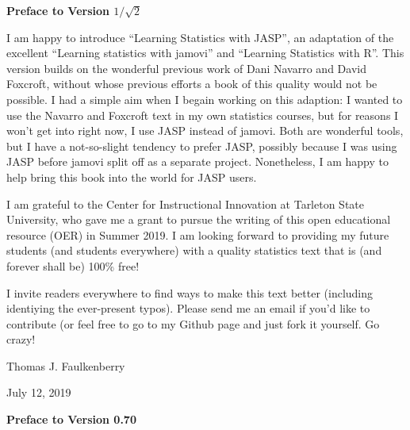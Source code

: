 

\newcommand{\vsp}{\vspace*{6pt}}

\begin{center}{\Large {\bf Preface to Version $1/\sqrt{2}$}}\end{center}
\vspace*{12pt}

\noindent
I am happy to introduce ``Learning Statistics with JASP'', an adaptation of the excellent ``Learning statistics with jamovi'' and ``Learning Statistics with R''. This version builds on the wonderful previous work of Dani Navarro and David Foxcroft, without whose previous efforts a book of this quality would not be possible. I had a simple aim when I begain working on this adaption: I wanted to use the Navarro and Foxcroft text in my own statistics courses, but for reasons I won't get into right now, I use JASP instead of jamovi.  Both are wonderful tools, but I have a not-so-slight tendency to prefer JASP, possibly because I was using JASP before jamovi split off as a separate project.  Nonetheless, I am happy to help bring this book into the world for JASP users.

I am grateful to the Center for Instructional Innovation at Tarleton State University, who gave me a grant to pursue the writing of this open educational resource (OER) in Summer 2019. I am looking forward to providing my future students (and students everywhere) with a quality statistics text that is (and forever shall be) 100\% free!

I invite readers everywhere to find ways to make this text better (including identiying the ever-present typos).  Please send me an email if you'd like to contribute (or feel free to go to my Github page and just fork it yourself.  Go crazy!

\vspace*{24pt}
\noindent
Thomas J. Faulkenberry 

\noindent
July 12, 2019


\begin{center}{\Large {\bf Preface to Version 0.70}}\end{center}
\vspace*{12pt}

